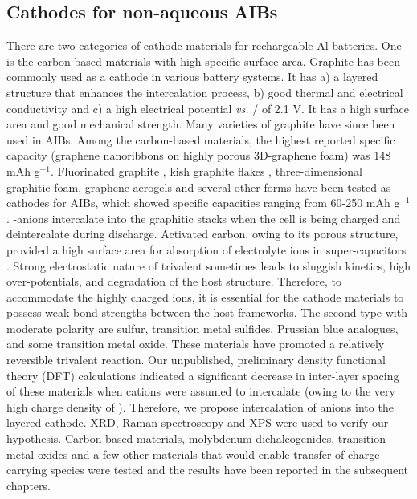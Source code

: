 \subsection{Cathodes for non-aqueous AIBs}
There are two categories of cathode materials for rechargeable Al batteries. One is the carbon-based materials with high specific surface area. Graphite has been commonly used as a cathode in various battery systems. It has a) a layered structure that enhances the intercalation process, b) good thermal and electrical conductivity and c) a high electrical potential \textit{vs.} / of 2.1 V. It has a high surface area and good mechanical strength. Many varieties of graphite have since been used in AIBs. Among the carbon-based materials, the highest reported specific capacity (graphene nanoribbons on highly porous 3D-graphene foam) was 148 mAh g$^{-1}$. Fluorinated graphite \cite{rani_fluorinated_2013}, kish graphite flakes \cite{wang_kish_2017-1}, three-dimensional graphitic-foam\cite{wu_3d_2016}, graphene aerogels\cite{huang_graphene_2019} and several other forms have been tested as cathodes for AIBs, which showed specific capacities ranging from 60-250 mAh g$^{-1}$. -anions intercalate into the graphitic stacks when the cell is being charged and deintercalate during discharge. Activated carbon, owing to its porous structure, provided a high surface area for absorption of electrolyte ions in super-capacitors \cite{eliad_ion_2001, zhu_carbon-based_2011-2}.
Strong electrostatic nature of trivalent  sometimes leads to sluggish kinetics, high over-potentials, and degradation of the host structure. Therefore, to accommodate the highly charged ions, it is essential for the cathode materials to possess weak bond strengths between the host frameworks. The second type with moderate polarity are sulfur, transition metal sulfides, Prussian blue analogues, and some transition metal oxide. These materials have promoted a relatively reversible trivalent reaction. Our unpublished, preliminary density functional theory (DFT) calculations indicated a significant decrease in inter-layer spacing of these materials when  cations were assumed to intercalate (owing to the very high charge density of ). Therefore, we propose intercalation of  anions into the layered cathode. XRD, Raman spectroscopy and XPS were used to verify our hypothesis.
Carbon-based materials, molybdenum dichalcogenides, transition metal oxides and a few other materials that would enable transfer of charge-carrying species were tested and the results have been reported in the subsequent chapters.

